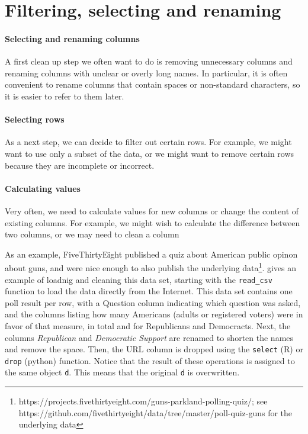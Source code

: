 \section{Filtering, selecting and renaming}


\paragraph{Selecting and renaming columns}
A first clean up step we often want to do is removing unnecessary columns and renaming columns with unclear or overly long names.
In particular, it is often convenient to rename columns that contain spaces or non-standard characters, so it is easier to refer to them later.

\paragraph{Selecting rows}
As a next step, we can decide to filter out certain rows.
For example, we might want to use only a subset of the data,
or we might want to remove certain rows because they are incomplete or incorrect.

\paragraph{Calculating values}
Very often, we need to calculate values for new columns or change the content of existing columns.
For example, we might wish to calculate the difference between two columns,
or we may need to clean a column


As an example, FiveThirtyEight published a quiz about American public opinon about guns,
and were nice enough to also publish the underlying data\footnote{https://projects.fivethirtyeight.com/guns-parkland-polling-quiz/; see https://github.com/fivethirtyeight/data/tree/master/poll-quiz-guns for the underlying data}.
 gives an example of loadnig and cleaning this data set, starting with the \verb+read_csv+ function to load the data directly from the Internet.
This data set contains one poll result per row, with a Question column indicating which question was asked,
and the columns listing how many Americans (adults or registered voters) were in favor of that measure, in total and for Republicans and Democracts.
Next, the columns \emph{Republican} and \emph{Democratic Support} are renamed to shorten the names and remove the space.
Then, the URL column is dropped using the \verb+select+ (R) or \verb+drop+ (python) function.
Notice that the result of these operations is assigned to the same object \verb+d+.
This means that the original \verb+d+ is overwritten.

